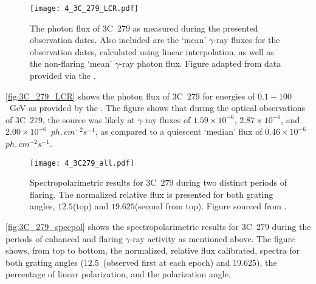 \begin{figure}[t]
    \centering
    \texttt{[image: 4\_3C\_279\_LCR.pdf]}
    \caption{The photon flux of 3C~$279$ as measured during the presented observation dates. Also included are the `mean' $\gamma$-ray fluxes for the observation dates, calculated using linear interpolation, as well as the non-flaring `mean' $\gamma$-ray photon flux. Figure adapted from data provided via the .\protect\footnotemark}
    \label{fig:3C_279_LCR}
\end{figure}

\autoref{fig:3C_279_LCR} shows the photon flux of 3C~$279$ for energies of $0.1 - 100$~GeV as provided by the  \citep{FermiLCR}. The figure shows that during the optical observations of 3C~$279$, the source was likely at $\gamma$-ray fluxes of $1.59 \times 10^{-6}$, $2.87 \times 10^{-6}$, and $2.00 \times 10^{-6}$~$ph.\,cm^{-2}s^{-1}$, as compared to a quiescent `median' flux of $0.46 \times 10^{-6}$~$ph.\,cm^{-2}s^{-1}$.

\begin{figure}[t]
    \centering
    \texttt{[image: 4\_3C279\_all.pdf]}
    \caption{Spectropolarimetric results for 3C~$279$ during two distinct periods of flaring. The normalized relative flux is presented for both grating angles, $12.5$\degree (top) and $19.625$\degree (second from top). Figure sourced from \citep{cooper_HEASA2022}.}
    \label{fig:3C_279_specpol}
\end{figure}

\autoref{fig:3C_279_specpol} shows the spectropolarimetric results for 3C~$279$ during the periods of enhanced and flaring $\gamma$-ray activity as mentioned above.
The figure shows, from top to bottom, the normalized, relative flux calibrated, spectra for both grating angles ($12.5$\degree\ (observed first at each epoch) and $19.625$\degree), the percentage of linear polarization, and the polarization angle.

